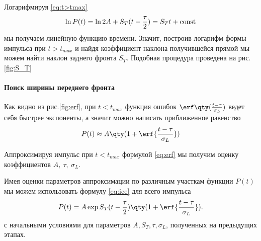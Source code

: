 Логарифмируя \eqref{eq:t>tmax}
\begin{equation}
    \ln P(t) = \ln 2A + S_T( t - \frac{\tau}{2}) = S_T t + \text{\rmfamily\upshape const} 
\end{equation}
мы получаем линейную функцию времени. Значит, построив логарифм формы импульса при
$t>t_{max}$ и найдя коэффициент наклона получившейся прямой мы можем найти
наклон заднего фронта $S_T$. Подобная процедура проведена на рис.\ref{fig:S_T}

\paragraph{Поиск ширины переднего фронта}%
Как видно из рис.\ref{fig:erf}, при $t<t_{max}$ функция ошибок
$\erf\qty(\frac{t - \tau}{\sigma_L})$ ведет себя
быстрее экспоненты, а значит можно написать приближенное равенство
\begin{equation}
    \label{eq:erf}
    P(t) \approx A \qty(1 + \erf{\frac{t - \tau}{\sigma_L}})
\end{equation}


Аппроксимируя импульс при $t<t_{max}$ формулой \eqref{eq:erf} мы получим оценку
коэффициентов $A,~\tau,~\sigma_L$. 

\label{par:etap_4_zakliuchitel_naia_approksimatsiia_}

 Имея оценки параметров аппроксимации по различным
участкам функции $P(t)$ мы можем использовать формулу  \eqref{eq:ice} для всего
импульса 
\begin{equation}
    \label{eq:ice}
    P(t) = A \exp{ S_T (t - \frac{\tau}{2})} \qty(1 + \erf{\frac{t-
    \tau}{\sigma_L}}).
\end{equation}
с начальными условиями для параметров $A, S_T, \tau, \sigma_L$, полученных на
предыдущих этапах. 


